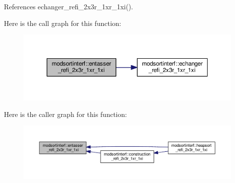 References echanger\+\_\+refi\+\_\+2x3r\+\_\+1xr\+\_\+1xi().



Here is the call graph for this function\+:\nopagebreak
\begin{figure}[H]
\begin{center}
\leavevmode
\includegraphics[width=350pt]{namespacemodsortinterf_a67991c6305dfcc00beccf5b59b56a27a_cgraph}
\end{center}
\end{figure}




Here is the caller graph for this function\+:\nopagebreak
\begin{figure}[H]
\begin{center}
\leavevmode
\includegraphics[width=350pt]{namespacemodsortinterf_a67991c6305dfcc00beccf5b59b56a27a_icgraph}
\end{center}
\end{figure}


